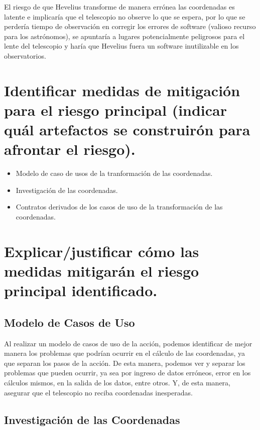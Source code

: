 \documentclass[letterpaper,spanish,10pt]{article}
\begin{document}
El riesgo de que Hevelius transforme de manera err\'onea las coordenadas es latente e implicar\'ia que el telescopio no observe
lo que se espera, por lo que se perder\'ia tiempo de observaci\'on en corregir los errores de software (valioso recurso para los
astr\'onomos), se apuntar\'ia a lugares potencialmente peligrosos para el lente del telescopio y har\'ia que Hevelius fuera un software
inutilizable en los observatorios.



\section{Identificar medidas de mitigaci\'on para el riesgo principal (indicar qu\'al artefactos se construir\'on para afrontar el riesgo).}

\begin{itemize}
	\item Modelo de caso de usos de la tranformaci\'on de las coordenadas.
	\item Investigaci\'on de las coordenadas.
	\item Contratos derivados de los casos de uso de la transformaci\'on de las coordenadas.
\end{itemize}


\section{Explicar/justificar c\'omo las medidas mitigar\'an el riesgo principal identificado.}

\subsection{Modelo de Casos de Uso}

Al realizar un modelo de casos de uso de la acci\'on, podemos identificar de mejor manera los problemas que podr\'ian ocurrir en el c\'alculo de las coordenadas, ya que separan los pasos de la acci\'on. De esta manera, podemos ver y separar los problemas que pueden ocurrir, ya sea por ingreso de datos err\'oneos, error en los c\'alculos mismos, en la salida de los datos, entre otros. Y, de esta manera, asegurar que el telescopio no reciba coordenadas inesperadas.

\subsection{Investigaci\'on de las Coordenadas}
\end{document}
